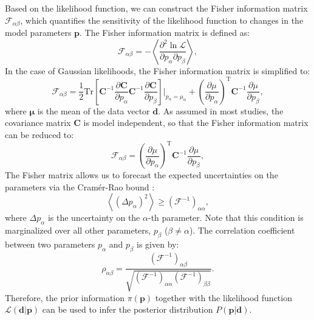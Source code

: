 Based on the likelihood function, we can construct the Fisher information matrix $\mathcal{F}_{\alpha\beta}$, which quantifies the sensitivity of the likelihood function to changes in the model parameters $\mathbf{p}$. The Fisher information matrix is defined as:
\begin{equation}
    \mathcal{F}_{\alpha\beta} = -\left\langle \frac{\partial^2 \ln \mathcal{L}}{\partial p_\alpha \partial p_\beta} \right\rangle,
\end{equation}
In the case of Gaussian likelihoods, the Fisher information matrix is simplified to:
\begin{equation}
    \mathcal{F}_{\alpha\beta} = \frac{1}{2} \mathrm{Tr} \left[ \mathbf{C}^{-1} \frac{\partial \mathbf{C}}{\partial p_\alpha} \mathbf{C}^{-1} \frac{\partial \mathbf{C}}{\partial p_\beta} \right]\Bigg|_{p_\alpha = \mu_\alpha} + \left(\frac{\partial \mu}{\partial p_\alpha}\right)^{\mathrm{T}} \mathbf{C}^{-1} \frac{\partial \mu}{\partial p_\beta},
\end{equation}
where $\mathbf{\mu}$ is the mean of the data vector $\mathbf{d}$. 
As assumed in most studies, the covariance matrix $\mathbf{C}$ is model independent, so that the Fisher information matrix can be reduced to:
\begin{equation}
    \mathcal{F}_{\alpha\beta} = \left(\frac{\partial \mu}{\partial p_\alpha}\right)^{\mathrm{T}} \mathbf{C}^{-1} \frac{\partial \mu}{\partial p_\beta},
\end{equation}
The Fisher matrix allows us to forecast the expected uncertainties on the parameters via the Cramér-Rao bound \citep{rao1952advanced}:
\begin{equation}
    \left\langle (\Delta p_\alpha)^2 \right\rangle \geq (\mathcal{F}^{-1})_{\alpha\alpha},
\end{equation}
where $\Delta p_\alpha$ is the uncertainty on the $\alpha$-th parameter. Note that this condition is marginalized over all other parameters, $p_\beta$ ($\beta \neq \alpha$). The correlation coefficient between two parameters $p_\alpha$ and $p_\beta$ is given by:
\begin{equation}
    \rho_{\alpha\beta} = \frac{(\mathcal{F}^{-1})_{\alpha\beta}}{\sqrt{(\mathcal{F}^{-1})_{\alpha\alpha} (\mathcal{F}^{-1})_{\beta\beta}}}.
\end{equation}
Therefore, the prior information $\pi(\mathbf{p})$ together with the likelihood function $\mathcal{L}(\mathbf{d} | \mathbf{p})$ can be used to infer the posterior distribution $P(\mathbf{p} | \mathbf{d})$.

